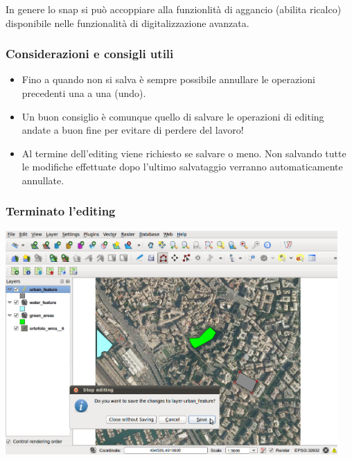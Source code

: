 \documentclass{beamer}
\begin{document}
{\begin{frame}
In genere lo snap si può accoppiare alla funzionlità di aggancio (abilita ricalco) %
disponibile nelle funzionalità di digitalizzazione avanzata.
\end{frame}

\begin{frame}
   \frametitle{Considerazioni e consigli utili}

    \begin{itemize}
	    \item Fino a quando non si salva è sempre possibile annullare le operazioni precedenti una a una (undo).
	    \item Un buon consiglio è comunque quello di salvare le operazioni di editing andate a buon fine per evitare di perdere del lavoro!
	    \item Al termine dell'editing viene richiesto se salvare o meno. Non salvando tutte le modifiche effettuate dopo l'ultimo salvataggio verranno automaticamente annullate. 
    \end{itemize}
\end{frame}



 \begin{frame}
   \frametitle{Terminato l'editing}
   
		    \begin{center}
			\includegraphics[width=0.95\textwidth] {digitizing_pics/finish_digit.png}
		    \end{center}

		    

\end{frame}






}
\end{document}
